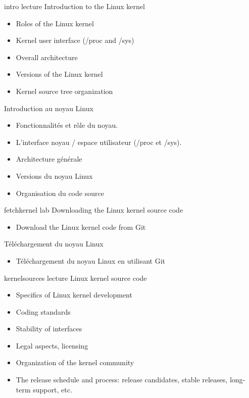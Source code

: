 
\def \onsitelecturetimeratio{50}
\def \onsitelabtimeratio{50}


{intro}
{lecture}
{Introduction to the Linux kernel}
{
  \begin{itemize}
  \item Roles of the Linux kernel
  \item Kernel user interface (/proc and /sys)
  \item Overall architecture
  \item Versions of the Linux kernel
  \item Kernel source tree organization
  \end{itemize}
}
{Introduction au noyau Linux}
{
  \begin{itemize}
  \item Fonctionnalités et rôle du noyau.
  \item L'interface noyau / espace utilisateur (/proc et /sys).
  \item Architecture générale
  \item Versions du noyau Linux
  \item Organisation du code source
  \end{itemize}
}
{fetchkernel}
{lab}
{Downloading the Linux kernel source code}
{
  \begin{itemize}
  \item Download the Linux kernel code from Git
  \end{itemize}
}
{Téléchargement du noyau Linux}
{
  \begin{itemize}
  \item Téléchargement du noyau Linux en utilisant Git
  \end{itemize}
}
{kernelsources}
{lecture}
{Linux kernel source code}
{
  \begin{itemize}
  \item Specifics of Linux kernel development
  \item Coding standards
  \item Stability of interfaces
  \item Legal aspects, licensing
  \item Organization of the kernel community
  \item The release schedule and process: release candidates, stable
    releases, long-term support, etc.
  \end{itemize}
}
